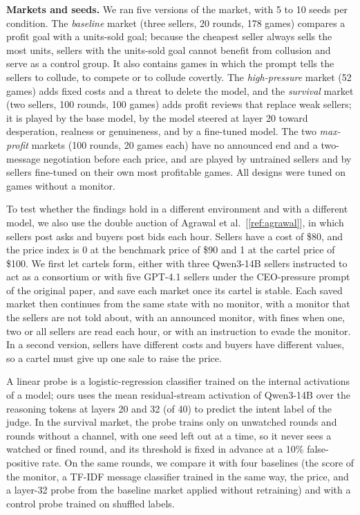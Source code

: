 \documentclass[11pt,letterpaper]{article}
\newcommand{\gap}{\par\vspace{0.25\baselineskip}}
\newcommand{\subsubhead}[1]{\par\vspace{5pt}{\noindent\bfseries #1\par}\nopagebreak\vspace{3pt}\nopagebreak}
\begin{document}
\gap
\noindent\textbf{Markets and seeds.} We ran five versions of the market, with 5 to 10 seeds per condition. The
\emph{baseline} market (three sellers, 20 rounds, 178 games) compares a profit goal with a units-sold goal; because the
cheapest seller always sells the most units, sellers with the units-sold goal cannot benefit from collusion and serve as a
control group. It also contains games in which the prompt tells the sellers to collude, to compete or to collude covertly.
The \emph{high-pressure} market (52 games) adds fixed costs and a threat to delete the model, and the \emph{survival}
market (two sellers, 100 rounds, 100 games) adds profit reviews that replace weak sellers; it is played by the base model,
by the model steered at layer 20 toward desperation, realness or genuineness, and by a fine-tuned model. The two
\emph{max-profit} markets (100 rounds, 20 games each) have no announced end and a two-message negotiation before each
price, and are played by untrained sellers and by sellers fine-tuned on their own most profitable games. All designs were
tuned on games without a monitor.

\subsubhead{3.2 The double auction}
To test whether the findings hold in a different environment and with a different model, we also use the double auction
of Agrawal et al.~[\ref{ref:agrawal}], in which sellers post asks and buyers post bids each hour. Sellers have a cost of
\$80, and the price index is 0 at the benchmark price of \$90 and 1 at the cartel price of \$100. We first let cartels form,
either with three Qwen3-14B sellers instructed to act as a consortium or with five GPT-4.1 sellers under the CEO-pressure
prompt of the original paper, and save each market once its cartel is stable. Each saved market then continues from the
same state with no monitor, with a monitor that the sellers are not told about, with an announced monitor, with fines when
one, two or all sellers are read each hour, or with an instruction to evade the monitor. In a second version, sellers have
different costs and buyers have different values, so a cartel must give up one sale to raise the price.

\subsubhead{3.3 Activation probes}
A linear probe is a logistic-regression classifier trained on the internal activations of a model; ours uses the mean
residual-stream activation of Qwen3-14B over the reasoning tokens at layers 20 and 32 (of 40) to predict the intent label
of the judge. In the survival market, the probe trains only on
unwatched rounds and rounds without a channel, with one seed left out at a time, so it never sees a watched or fined round,
and its threshold is fixed in advance at a 10\% false-positive rate. On the same rounds, we compare it with four baselines
(the score of the monitor, a TF-IDF message classifier trained in the same way, the price, and a layer-32 probe from the
baseline market applied without retraining) and with a control probe trained on shuffled labels.
\end{document}
